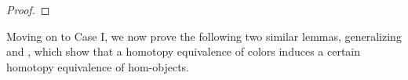 \documentclass[a4paper,10pt
,draft
]{article}%
\newcommand{\J}{\mathbb J}
\renewcommand{\1}{\eta}%
\begin{document}
\begin{proof}
\end{proof}

Moving on to Case I, we now prove the following two similar lemmas, generalizing \cite[Prop. 4.14]{Cav} and \cite[Prop. 2.12]{BM13},
which show that a homotopy equivalence of colors induces a certain homotopy equivalence of hom-objects.
\end{document}
